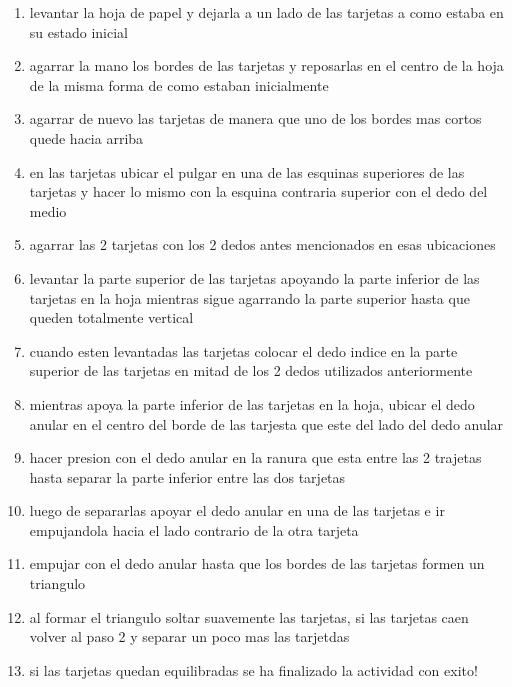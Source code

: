 \documentclass{article}
\begin{document}
\begin{enumerate}
    \vspace{0.8cm}
    \item levantar la hoja de papel y dejarla a un lado de las tarjetas a como estaba en su estado inicial
    \item agarrar la mano los bordes de las tarjetas  y reposarlas en el centro de la hoja de la misma forma de como estaban inicialmente
    \item agarrar de nuevo las tarjetas de manera que uno de los bordes mas cortos quede hacia arriba
    \item en las tarjetas ubicar el pulgar en una de las esquinas superiores de las tarjetas  y hacer lo mismo con la esquina contraria superior con el dedo del medio 
    \item agarrar las 2 tarjetas con los 2 dedos antes mencionados en esas ubicaciones 
    \item levantar la parte superior de las tarjetas apoyando la parte inferior de las tarjetas en la hoja mientras sigue agarrando la parte superior hasta que queden totalmente     vertical
    \item cuando esten levantadas las tarjetas colocar el dedo indice en la parte superior de las tarjetas en mitad de los 2 dedos utilizados anteriormente
    \item mientras apoya la parte inferior de las tarjetas en la hoja, ubicar el dedo anular en el centro del borde de las tarjesta que este del lado del dedo anular
    \item hacer presion con el dedo anular en la ranura  que esta entre las 2 trajetas hasta separar la parte inferior entre las dos tarjetas 
    \item luego de separarlas apoyar el dedo anular en una de las tarjetas e ir empujandola hacia el lado contrario de la otra tarjeta 
    \item empujar con el dedo anular hasta que los bordes de las tarjetas formen un triangulo 
    \item al formar el triangulo soltar suavemente las tarjetas, si las tarjetas caen volver al paso 2 y separar un poco mas las tarjetdas
    \item si las tarjetas quedan equilibradas se ha finalizado la actividad con exito!
\end{enumerate}
\end{document}
